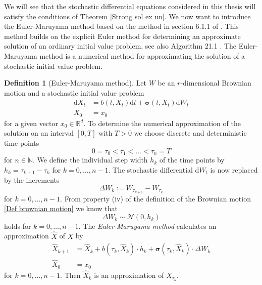 \documentclass[11pt,titlepage]{article}
\newcommand{\R}{\mathbb{R}} %
\newcommand{\N}{\mathbb{N}} %
\theoremstyle{definition}
\newtheorem{definition}[theorem]{Definition}
\theoremstyle{remark}
\begin{document}
	We will see that the stochastic differential equations considered in this thesis will
	satisfy the conditions of Theorem \ref{Strong sol ex un}. 
	\newpage
	We now want to introduce the Euler-Maruyama method based on the method in section 6.1.1 of \cite{Glasserman2004}. This method builds on the explicit Euler method for determining an approximate solution of an ordinary initial value problem, see also Algorithm 21.1 \cite{Bartels2016}. The Euler-Maruyama method is a numerical method for approximating the solution of a stochastic initial value problem.
	
	\begin{definition}[Euler-Maruyama method]\label{Def Euler-Maruyama method} \label{Def Eul Mar method}
		Let $W$ be an $r$-dimensional Brownian motion and a stochastic initial value problem
		\begin{align*}
			\mathrm{d}X_t &= b(t, X_t)\mathrm{d}t + \boldsymbol{\sigma}(t, X_t)\mathrm{d}W_t \\
			X_0 &= x_0
		\end{align*}
		for a given vector $x_0\in\R^d$. To determine the numerical approximation of the solution on an interval 
		$[0,T]$ with $T>0$ we choose discrete and deterministic time points 
		\[0= \tau_0< \tau_1<\ldots< \tau_n =T\]
		for $n\in\N$. We define the individual step width $h_k$ of the time points by 
		$h_k = \tau_{k+1}-\tau_k$ for $k=0,\ldots,n-1$. The stochastic differential $\mathrm{d}W_t$ 
		is now replaced by the increments
		\[\Delta W_k := W_{\tau_{k+1}}-W_{\tau_k}\]
		for $k=0,\ldots,n-1$. From property (iv) of the definition of the Brownian motion \ref{Def brownian motion} we know that
		\[\Delta W_k \sim \mathcal{N}(0, h_k)\]
		holds for $k=0,\ldots, n-1$. The \textsl{Euler-Maruyama method} calculates an approximation $\hat{X}$ of $X$ by
		\begin{align*}
			\hat{X}_{k+1} &= \hat{X}_k + b(\tau_k, \hat{X}_k)\cdot h_k + \boldsymbol{\sigma}(\tau_k, \hat{X}_k)\cdot \Delta W_k\\
			\hat{X}_0 &= x_0
		\end{align*}
		for $k=0,\ldots,n-1$. Then $\hat{X}_k$ is an approximation of $X_{\tau_k}$.
		
	\end{definition}
	
\end{document}
